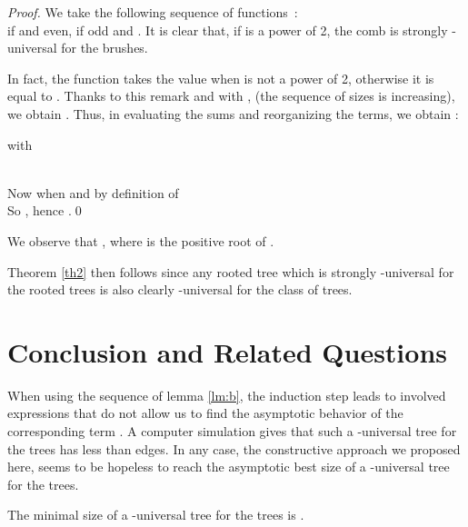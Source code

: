 \documentclass{llncs}
\begin{document}
\begin{proof}We take the following sequence of functions~:\\
 if  and  even,  if  odd and . It is clear that, if  is a power
of 2, the comb  is strongly -universal for the
brushes.

In fact, the function  takes the value  when  is not a power of 2, otherwise it is equal to .
Thanks to this remark and with , (the sequence of sizes is increasing), we obtain
.
Thus, in evaluating the sums and reorganizing the terms, we obtain :






\noindent
with







\\
Now  when  and  by definition
of \\ So , hence .\qed
\end{proof}


\begin{remark} We observe that , where  is the positive root of .
\end{remark}

\bigskip


Theorem \ref{th2} then follows since any rooted tree which is
strongly -universal for the rooted trees is also clearly
-universal for the class of trees.





\section{Conclusion and Related Questions}





When using the sequence  of lemma \ref{lm:b}, the induction step leads to
involved expressions that do not allow us to find the asymptotic
behavior of the corresponding term . A computer simulation
gives that such a -universal tree for the trees has less than
 edges. In any case, the constructive approach we
proposed here, seems to be hopeless to reach the asymptotic best
size of a -universal tree for the trees.





\begin{conjecture} The minimal size of a -universal tree for the
trees is .
\end{conjecture}
\end{document}
